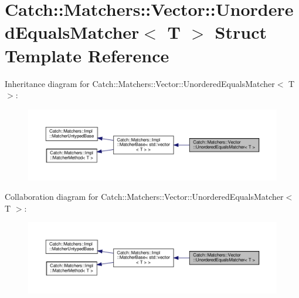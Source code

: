 \hypertarget{structCatch_1_1Matchers_1_1Vector_1_1UnorderedEqualsMatcher}{}\section{Catch\+::Matchers\+::Vector\+::Unordered\+Equals\+Matcher$<$ T $>$ Struct Template Reference}
\label{structCatch_1_1Matchers_1_1Vector_1_1UnorderedEqualsMatcher}


Inheritance diagram for Catch\+::Matchers\+::Vector\+::Unordered\+Equals\+Matcher$<$ T $>$\+:
\nopagebreak
\begin{figure}[H]
\begin{center}
\leavevmode
\includegraphics[width=350pt]{structCatch_1_1Matchers_1_1Vector_1_1UnorderedEqualsMatcher__inherit__graph}
\end{center}
\end{figure}


Collaboration diagram for Catch\+::Matchers\+::Vector\+::Unordered\+Equals\+Matcher$<$ T $>$\+:
\nopagebreak
\begin{figure}[H]
\begin{center}
\leavevmode
\includegraphics[width=350pt]{structCatch_1_1Matchers_1_1Vector_1_1UnorderedEqualsMatcher__coll__graph}
\end{center}
\end{figure}
